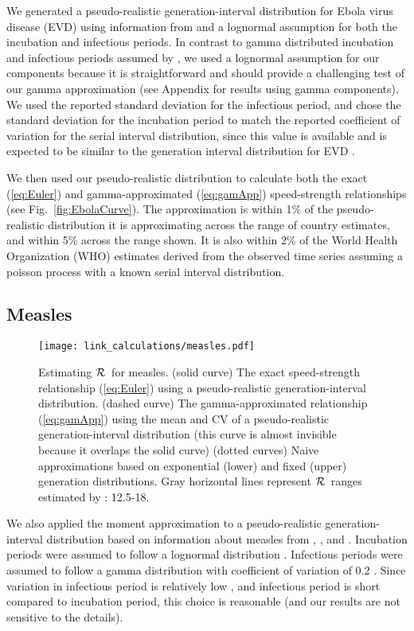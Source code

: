 \documentclass[12pt]{article}
\newcommand{\RR}{\ensuremath{{\cal R}}}
\newcommand{\eref}[1]{(\ref{eq:#1})}
\newcommand{\fref}[1]{Fig.~\ref{fig:#1}}
\begin{document}
We generated a pseudo-realistic generation-interval distribution for Ebola virus disease (EVD) using information from \cite{AylwBarb14} and a lognormal assumption for both the incubation and infectious periods.
In contrast to gamma distributed incubation and infectious periods assumed by \cite{AylwBarb14}, we used a lognormal assumption for our components because it is straightforward and should provide a challenging test of our gamma approximation (see Appendix for results using gamma components). 
We used the reported standard deviation for the infectious period, and chose the standard deviation for the incubation period to match the reported coefficient of variation for the serial interval distribution, since this value is available and is expected to be similar to the generation interval distribution for EVD \cite{AylwBarb14}.

We then used our pseudo-realistic distribution to calculate both the exact \eref{Euler} and gamma-approximated \eref{gamApp} speed-strength relationships (see \fref{EbolaCurve}). The approximation is within 1\% of the pseudo-realistic distribution it is approximating across the range of country estimates, and within 5\% across the range shown. It is also within 2\% of the World Health Organization (WHO) estimates derived from the observed time series assuming a poisson process with a known serial interval distribution. 

\subsection{Measles}
\label{MeaslesEx}

\begin{figure}[htbp] \centering
	\texttt{[image: link\_calculations/measles.pdf]}
	\caption{Estimating \RR~for measles.
		(solid curve) The exact speed-strength relationship \eref{Euler} using a pseudo-realistic generation-interval distribution.
		(dashed curve) The gamma-approximated relationship \eref{gamApp} using the mean and CV of a pseudo-realistic generation-interval distribution (this curve is almost invisible because it overlaps the solid curve)
		(dotted curves) Naive approximations based on exponential (lower) and fixed (upper) generation distributions.
		Gray horizontal lines represent \RR\ ranges estimated by \cite{anderson1982directly}: 12.5-18.
	}
	\label{fig:measlesCurve}
\end{figure}

We also applied the moment approximation to a pseudo-realistic generation-interval distribution based on information about measles from \cite{LessReic09}, \cite{Lloy01}, and \cite{anderson1982directly}. 
Incubation periods were assumed to follow a lognormal distribution \cite{LessReic09}. 
Infectious periods were assumed to follow a gamma distribution with coefficient of variation of 0.2 \cite{simpson1952infectiousness,Lloy01,KeelGren97}. Since variation in infectious period is relatively low \cite{simpson1952infectiousness,KeelGren97}, and infectious period is short compared to incubation period, this choice is reasonable (and our results are not sensitive to the details).
\end{document}
